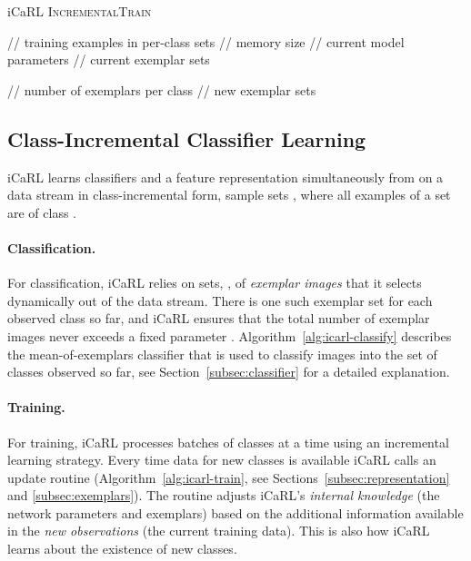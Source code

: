 \documentclass[10pt,twocolumn,letterpaper]{article}
\begin{document}
\begin{algorithm}[t]
\caption{iCaRL \textsc{IncrementalTrain}}\label{alg:icarl-train}
    \begin{algorithmic}
        \INPUT  \quad // training examples in per-class sets
        \INPUT  \qquad\qquad\quad // memory size
        \REQUIRE   \qquad\qquad\quad // current model parameters
        \REQUIRE  \qquad // current exemplar sets
        \smallskip
        \STATE 
        \smallskip

        \STATE  \qquad // number of exemplars per class
        \FOR{}
        \STATE 
        \ENDFOR
        \FOR{}
        \STATE 
        \ENDFOR
        \smallskip
        \STATE    \qquad\qquad   // new exemplar sets
    \end{algorithmic}
\end{algorithm}

\subsection{Class-Incremental Classifier Learning}\label{subsec:learning}

iCaRL learns classifiers and a feature representation 
simultaneously
from on a data stream in class-incremental form, \ie sample sets , where all examples of 
a set  are of class . 

\paragraph{Classification.} For classification, iCaRL relies on sets, , 
of \emph{exemplar images} that it selects dynamically 
out of the data stream. 
There is one such exemplar set for each observed class so far, 
and iCaRL ensures that the total number of exemplar images 
never exceeds a fixed parameter . 
Algorithm~\ref{alg:icarl-classify} describes the mean-of-exemplars 
classifier that is used to classify images into the set of classes 
observed so far, see Section~\ref{subsec:classifier} for a detailed 
explanation.

\paragraph{Training.} For training, iCaRL processes batches of classes at a time 
using an incremental learning strategy. 
Every time data for new classes is available iCaRL calls an 
update routine (Algorithm~\ref{alg:icarl-train}, see 
Sections~\ref{subsec:representation} and \ref{subsec:exemplars}). 
The routine adjusts iCaRL's \emph{internal knowledge} (the network 
parameters and exemplars) based on the additional information 
available in the \emph{new observations} (the current training data). 
This is also how iCaRL learns about the existence 
of new classes.
\end{document}
